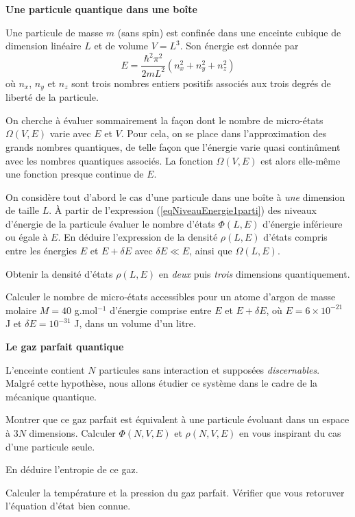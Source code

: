 {\sffamily\bfseries{Une particule quantique dans une boîte}}

Une particule de masse $m$ (sans spin) est confinée dans une enceinte cubique de dimension linéaire $L$ et de volume $V=L^3$. Son énergie est donnée par
\begin{equation} \label{eqNiveauEnergie1parti}
E=\frac{\hbar^2 \pi^2}{2mL^2} (n_{x}^{2}+n_{y}^{2}+n_{z}^{2})
\end{equation}
où $n_x$, $n_y$ et $n_z$ sont trois nombres entiers positifs associés aux trois degrés de liberté de la particule.

\medskip
On cherche à évaluer sommairement la façon dont le nombre de micro-états $\varOmega(V,E)$ varie avec $E$ et $V$. Pour cela, on se place dans l'approximation des grands nombres quantiques, de telle façon que l'énergie varie quasi continûment avec les nombres quantiques associés. La fonction $\varOmega(V,E)$ est alors elle-même une fonction presque continue de $E$.

\question
On considère tout d'abord le cas d'une particule dans une boîte à {\it une} dimension de taille $L$.  \`A partir de l'expression (\ref{eqNiveauEnergie1parti}) des niveaux d'énergie de la particule évaluer le nombre d'états $\Phi(L,E)$ d'énergie inférieure ou égale à $E$.  En déduire l'expression de la densité $\rho(L,E)$ d'états compris entre les énergies $E$ et $E + \delta E$ avec $\delta E\ll E$, ainsi que $\varOmega(L,E)$. 

\question
Obtenir la densité d'états $\rho(L,E)$ en {\it deux} puis {\it trois} dimensions quantiquement.
	
\question Calculer le nombre de micro-états accessibles pour un atome d'argon de masse molaire $M=40$ g.mol$^{-1}$ d'énergie comprise entre $E$ et $E+\delta E$, où $E=6 \times 10^{-21}$ J et $\delta E = 10^{-31}$ J, dans un volume d'un litre.

\medskip

{\sffamily\bfseries{Le gaz parfait quantique}}
	
L'enceinte contient $N$ particules sans interaction et supposées {\it discernables}. Malgré cette hypothèse, nous allons étudier ce système dans le cadre de la mécanique quantique.
	
\question
Montrer que ce gaz parfait est équivalent à une particule évoluant dans un espace à $3N$ dimensions. Calculer $\Phi(N,V,E)$ et $\rho(N,V,E)$ en vous inspirant du cas d'une particule seule.

\question
En déduire l'entropie de ce gaz.

\question
Calculer la température et la pression du gaz parfait. Vérifier que vous retoruver l'équation d'état bien connue.
